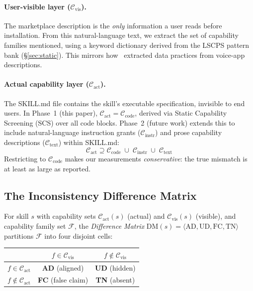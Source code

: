 \paragraph{User-visible layer ($\mathcal{C}_{\text{vis}}$).}
The marketplace description is the \emph{only} information a user
reads before installation. From this natural-language text,
we extract the set of capability families mentioned,
using a keyword dictionary derived from the LSCPS pattern bank (\S\ref{sec:static}).
This mirrors how~\cite{liao2020measuring} extracted data practices
from voice-app descriptions.

\paragraph{Actual capability layer ($\mathcal{C}_{\text{act}}$).}
The SKILL.md file contains the skill's executable specification,
invisible to end users. In Phase~1 (this paper),
$\mathcal{C}_{\text{act}} = \mathcal{C}_{\text{code}}$,
derived via Static Capability Screening (SCS) over all code blocks.
Phase~2 (future work) extends this to include natural-language
instruction grants ($\mathcal{C}_{\text{instr}}$) and
prose capability descriptions ($\mathcal{C}_{\text{text}}$) within SKILL.md:
\[
  \mathcal{C}_{\text{act}} \supseteq \mathcal{C}_{\text{code}}
  \;\cup\; \mathcal{C}_{\text{instr}} \;\cup\; \mathcal{C}_{\text{text}}
\]
Restricting to $\mathcal{C}_{\text{code}}$ makes our measurements
\emph{conservative}: the true mismatch is at least as large as reported.

\subsection{The Inconsistency Difference Matrix}

\begin{definition}
\label{def:dm}
For skill $s$ with capability sets $\mathcal{C}_{\text{act}}(s)$ (actual) and
$\mathcal{C}_{\text{vis}}(s)$ (visible), and capability family set $\mathcal{F}$,
the \emph{Difference Matrix} $\text{DM}(s) = \langle\text{AD},\text{UD},\text{FC},\text{TN}\rangle$
partitions $\mathcal{F}$ into four disjoint cells:
\end{definition}

\vspace{-0.5em}
\begin{center}
\small
\begin{tabular}{@{}lcc@{}}
\toprule
 & $f \in \mathcal{C}_{\text{vis}}$ & $f \notin \mathcal{C}_{\text{vis}}$ \\
\midrule
$f \in \mathcal{C}_{\text{act}}$ & \textbf{AD} (aligned) & \textbf{UD} (hidden) \\
$f \notin \mathcal{C}_{\text{act}}$ & \textbf{FC} (false claim) & \textbf{TN} (absent) \\
\bottomrule
\end{tabular}
\end{center}

